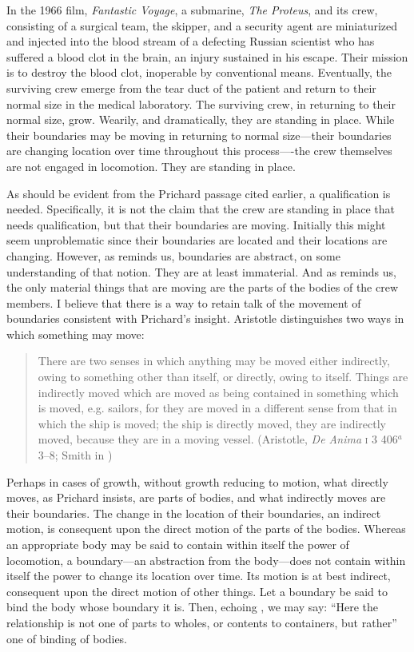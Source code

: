 In the 1966 film, \emph{Fantastic Voyage}, a submarine, \emph{The Proteus}, and its crew, consisting of a surgical team, the skipper, and a security agent are miniaturized and injected into the blood stream of a defecting Russian scientist who has suffered a blood clot in the brain, an injury sustained in his escape. Their mission is to destroy the blood clot, inoperable by conventional means. Eventually, the surviving crew emerge from the tear duct of the patient and return to their normal size in the medical laboratory. The surviving crew, in returning to their normal size, grow. Wearily, and dramatically, they are standing in place. While their boundaries may be moving in returning to normal size---their boundaries are changing location over time throughout this process----the crew themselves are not engaged in locomotion. They are standing in place.

As should be evident from the Prichard passage cited earlier, a qualification is needed. Specifically, it is not the claim that the crew are standing in place that needs qualification, but that their boundaries are moving. Initially this might seem unproblematic since their boundaries are located and their locations are changing. However, as \citet[103--4]{Derrida:2005aa} reminds us, boundaries are abstract, on some understanding of that notion. They are at least immaterial. And as \citet{Prichard:1950kx} reminds us, the only material things that are moving are the parts of the bodies of the crew members. I believe that there is a way to retain talk of the movement of boundaries consistent with Prichard's insight. Aristotle distinguishes two ways in which something may move: 
\begin{quote}
	There are two senses in which anything may be moved either indirectly, owing to something other than itself, or directly, owing to itself. Things are indirectly moved which are moved as being contained in something which is moved, e.g. sailors, for they are moved in a different sense from that in which the ship is moved; the ship is directly moved, they are indirectly moved, because they are in a moving vessel. (Aristotle, \emph{De Anima} \textsc{i} 3 406\( ^{a} \)3--8; Smith in \citealt[9]{Barnes:1984uq})
\end{quote} 
Perhaps in cases of growth, without growth reducing to motion, what directly moves, as Prichard insists, are parts of bodies, and what indirectly moves are their boundaries. The change in the location of their boundaries, an indirect motion, is consequent upon the direct motion of the parts of the bodies. Whereas an appropriate body may be said to contain within itself the power of locomotion, a boundary---an abstraction from the body---does not contain within itself the power to change its location over time. Its motion is at best indirect, consequent upon the direct motion of other things. Let a boundary be said to bind the body whose boundary it is. Then, echoing \citet[174]{Witt:1995kx}, we may say: ``Here the relationship is not one of parts to wholes, or contents to containers, but rather'' one of binding of bodies.

